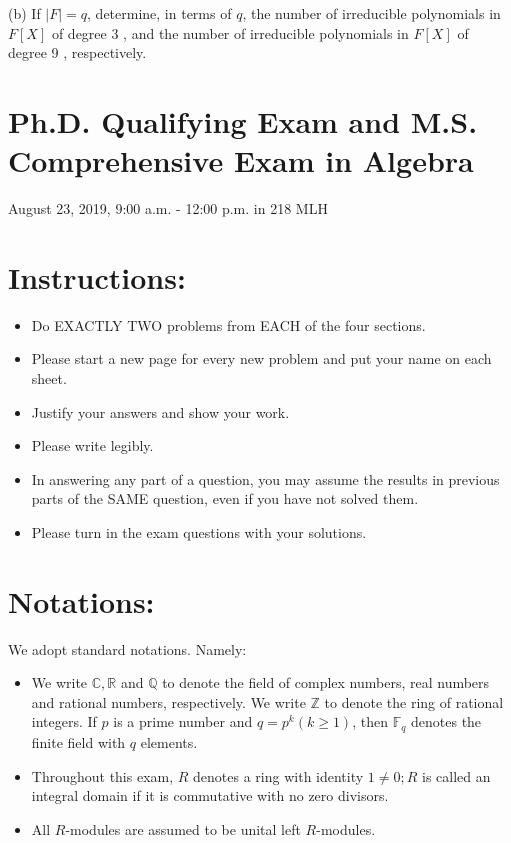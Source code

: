 \documentclass[10pt]{article}
\begin{document}
(b) If $|F|=q$, determine, in terms of $q$, the number of irreducible polynomials in $F[X]$ of degree 3 , and the number of irreducible polynomials in $F[X]$ of degree 9 , respectively.

\section*{Ph.D. Qualifying Exam and M.S. Comprehensive Exam in Algebra }

August 23, 2019, 9:00 a.m. - 12:00 p.m. in 218 MLH

\section*{Instructions: }
\begin{itemize}
  \item Do EXACTLY TWO problems from EACH of the four sections.

  \item Please start a new page for every new problem and put your name on each sheet.

  \item Justify your answers and show your work.

  \item Please write legibly.

  \item In answering any part of a question, you may assume the results in previous parts of the SAME question, even if you have not solved them.

  \item Please turn in the exam questions with your solutions.

\end{itemize}
\section{Notations:}
We adopt standard notations. Namely:

\begin{itemize}
  \item We write $\mathbb{C}, \mathbb{R}$ and $\mathbb{Q}$ to denote the field of complex numbers, real numbers and rational numbers, respectively. We write $\mathbb{Z}$ to denote the ring of rational integers. If $p$ is a prime number and $q=p^{k}(k \geq 1)$, then $\mathbb{F}_{q}$ denotes the finite field with $q$ elements.

  \item Throughout this exam, $R$ denotes a ring with identity $1 \neq 0 ; R$ is called an integral domain if it is commutative with no zero divisors.

  \item All $R$-modules are assumed to be unital left $R$-modules.

\end{itemize}
\end{document}
